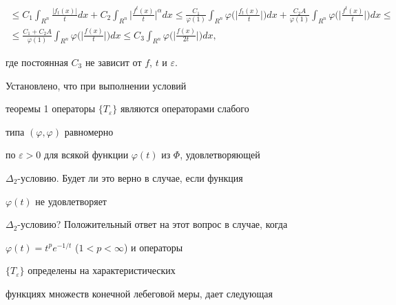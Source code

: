 \begin{pf}
\begin{multline*}
% 


\le C_1\int_{R^n}\frac{|f_t(x)|}{t}d x+C_2\int_{R^n} 


\bigg|\frac{f^t(x)}{t}\bigg|^\alpha d x\le 


\frac{C_1}{\varphi(1)}\int_{R^n}\varphi\bigg(\bigg| 


\frac{f_t(x)}{t}\bigg|\bigg)d x+\frac{C_2A}{\varphi(1)} 


\int_{R^n}\varphi\bigg(\bigg|\frac{f^t(x)}{t}\bigg|\bigg)d x\le \\ 


% 


\le\frac{C_1+C_2A}{\varphi(1)}\int_{R^n}\varphi\bigg(\bigg| 


\frac{f(x)}{t}\bigg|\bigg)d x\le C_3\int_{R^n}\varphi\bigg(\bigg| 


\frac{f(x)}{2t}\bigg|\bigg)d x, 


\end{multline*} 


где постоянная $C_3$ не зависит от $f$, $t$ и $\varepsilon$. 


\end{pf} 


 


\begin{notenonum} 


Установлено, что при выполнении условий 


теоремы 1 операторы $\{T_\varepsilon\}$ являются операторами слабого 


типа $(\varphi,\varphi)$ равномерно 


по $\varepsilon>0$ для всякой функции $\varphi(t)$ из $\Phi$, удовлетворяющей 


$\Delta_2$-условию. Будет ли это верно в случае, если функция 


$\varphi(t)$ не удовлетворяет 


$\Delta_2$-условию? Положительный ответ на этот вопрос в случае, когда 


$\varphi(t)=t^p e^{-1/t}$ ($1<p<\infty$) и операторы 


$\{T_\varepsilon\}$ определены на характеристических 


функциях множеств конечной лебеговой меры, дает следующая 


\end{notenonum}


 



